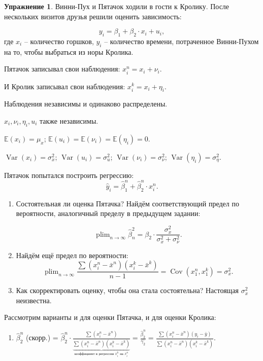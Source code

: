 \documentclass[12pt]{article} %
\theoremstyle{definition} %
\newtheorem{exercise}{Упражнение}[section]
\DeclareMathOperator{\Cov}{Cov}
\DeclareMathOperator{\Var}{Var}
\DeclareMathOperator{\plim}{plim}
\begin{document}
\begin{exercise}
Винни-Пух и Пятачок ходили в гости к Кролику. После нескольких визитов друзья решили оценить зависимость:

\[ y_i = \beta_1 + \beta_2 \cdot x_i + u_i,
\]
где $x_i$ -- количество горшков, $y_i$ -- количество времени, потраченное Винни-Пухом на то, чтобы выбраться из норы Кролика.

Пятачок записывал свои наблюдения:
$x_i^n = x_i + \nu_i$.

И Кролик записывал свои наблюдения:
$x_i^k = x_i + \eta_i$.

Наблюдения независимы и одинаково распределены.

$x_i, \nu_i, \eta_i,  u_i$ также независимы.

$\mathbb{E}(x_i) = \mu_x$; $\mathbb{E}(u_i) = \mathbb{E}(\nu_i) = \mathbb{E}(\eta_i) = 0$.

$\Var(x_i) = \sigma_x^2$;
$\Var(u_i) = \sigma_u^2$;
$\Var(\nu_i) = \sigma_{\nu}^2$;
$\Var(\eta_i) = \sigma_{\eta}^2$.

Пятачок попытался построить регрессию:
\[
\hat{y}_i = \hat{\beta}_1^n + \hat{\beta}_2^n \cdot x_i^n.
\]

\begin{enumerate}
    \item

    Состоятельная ли оценка Пятачка? Найдём соответствующий предел по вероятности, аналогичный пределу в предыдущем задании:

    \[\displaystyle \plim_{n \rightarrow \infty} \hat{\beta}_n^2 = \beta_2 \cdot \frac{\sigma_x^2}{\sigma_x^2 + \sigma_{\nu}^2}.\]

    \item Найдём ещё предел по вероятности:
    \[\displaystyle \plim_{n \rightarrow \infty} \frac{\sum (x_i^n - \bar{x}^n)(x_i^k - \bar{x}^k)}{n - 1} = \Cov(x_1^n, x_1^k) = \sigma_x^2.\]

    \item Как скорректировать оценку, чтобы она стала состоятельна? Настоящая $\sigma_x^2$ неизвестна.
\end{enumerate}



Рассмотрим варианты и для оценки Пятачка, и для оценки Кролика:
\begin{enumerate}
    \item $\displaystyle \hat{\beta}_{2}^n$ (скорр.) = $\displaystyle \hat{\beta}_{2}^n \cdot \frac{\sum (x_i^n - \bar{x}^n)}{\underbrace{\sum (x_i^n - \bar{x}^n)(x_i^k - \bar{x}^k)}_\text{коэффициент в регрессии $x_i^k$ на $x_i^n$}} = \frac{\hat{\beta}_{2}^n}{\hat{\gamma_2}} = \frac{\sum (x_i^n - \bar{x}^n)(y_i - \bar{y})}{\sum (x_i^n - \bar{x}^n)(x_i^k - \bar{x}^k)}$.


\end{enumerate}
\end{exercise}
\end{document}
